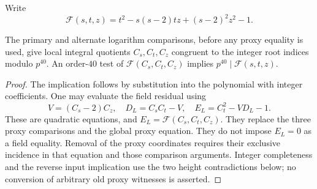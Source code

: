Write
\[
 \mathcal F(s,t,z)=t^2-s(s-2)tz+(s-2)^2z^2-1.
\]
\begin{lemma}\label{lem:quartic-local-lucas}
The primary and alternate logarithm comparisons, before any proxy equality
is used, give local integral quotients $C_s,C_t,C_z$ congruent to the
integer root indices modulo $p^{40}$. An order-$40$ test of
$\mathcal F(C_s,C_t,C_z)$ implies $p^{40}\mid\mathcal F(s,t,z)$.
\end{lemma}
\begin{proof}
The implication follows by substitution into the polynomial with integer
coefficients. One may evaluate the field residual using
\[
 V=(C_s-2)C_z,\quad D_L=C_sC_t-V,\quad
 E_L=C_t^2-VD_L-1.
\]
These are quadratic equations, and $E_L=\mathcal F(C_s,C_t,C_z)$.
They replace the three proxy comparisons and the global proxy equation.
They do not impose $E_L=0$ as a field equality. Removal of the proxy
coordinates requires their exclusive incidence in that equation and those
comparison arguments. Integer completeness and the reverse input
implication use the two height contradictions below; no conversion of
arbitrary old proxy witnesses is asserted.
\end{proof}

